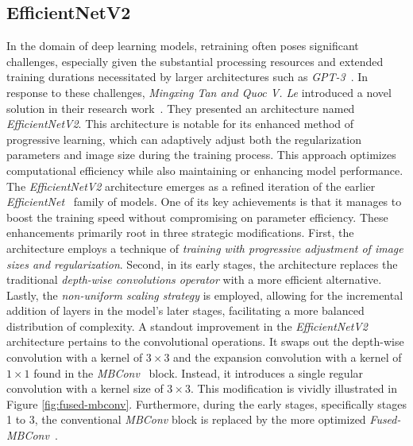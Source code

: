 \subsection{EfficientNetV2}
In the domain of deep learning models, retraining often poses significant challenges, especially given the substantial processing resources and extended training durations necessitated by larger architectures such as \textit{GPT-3}~\cite{DBLP:journals/corr/abs-2005-14165}. In response to these challenges, \textit{Mingxing Tan and Quoc V. Le} introduced a novel solution in their research work~\cite{tan2021efficientnetv2}. They presented an architecture named \textit{EfficientNetV2}. This architecture is notable for its enhanced method of progressive learning, which can adaptively adjust both the regularization parameters and image size during the training process. This approach optimizes computational efficiency while also maintaining or enhancing model performance.\\

The \textit{EfficientNetV2} architecture emerges as a refined iteration of the earlier \textit{EfficientNet}~\cite{pmlr-v97-tan19a} family of models. One of its key achievements is that it manages to boost the training speed without compromising on parameter efficiency. These enhancements primarily root in three strategic modifications. First, the architecture employs a technique of \textit{training with progressive adjustment of image sizes and regularization}. Second, in its early stages, the architecture replaces the traditional \textit{depth-wise convolutions operator} with a more efficient alternative. Lastly, the \textit{non-uniform scaling strategy} is employed, allowing for the incremental addition of layers in the model's later stages, facilitating a more balanced distribution of complexity.
A standout improvement in the \textit{EfficientNetV2} architecture pertains to the convolutional operations. It swaps out the depth-wise convolution with a kernel of $3\times 3$ and the expansion convolution with a kernel of $1\times 1$ found in the \textit{MBConv}~\cite{DBLP:journals/corr/abs-1801-04381, pmlr-v97-tan19a} block. Instead, it introduces a single regular convolution with a kernel size of $3\times 3$. This modification is vividly illustrated in Figure \ref{fig:fused-mbconv}. Furthermore, during the early stages, specifically stages 1 to 3, the conventional \textit{MBConv} block is replaced by the more optimized \textit{Fused-MBConv}~\cite{Gupta_Tan2019}.\\

